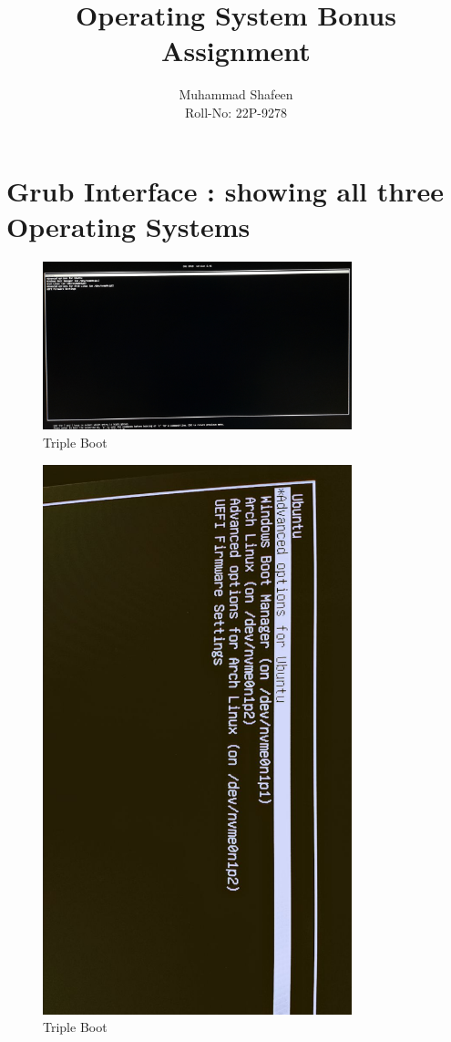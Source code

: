 \documentclass{article}
\title{Operating System Bonus Assignment}
\author{Muhammad Shafeen \\ Roll-No: 22P-9278}
\date{}
\begin{document}
\maketitle

\section{Grub Interface : showing all three Operating Systems}
\begin{figure}[H]
    \centering
    \includegraphics[width=0.8\textwidth]{20240919_174234.jpg}
    \caption{Triple Boot}
\end{figure}

\begin{figure}[H]
    \centering
    \includegraphics[width=0.8\textwidth]{12.jpg}
    \caption{Triple Boot}
\end{figure}
\end{document}
